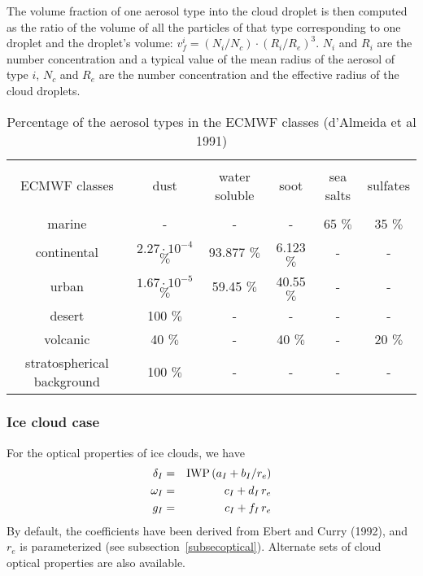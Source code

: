 The volume fraction of one aerosol type into the cloud droplet is then computed as the ratio of the volume of all the particles of that type corresponding to one droplet and the droplet's volume: $v_f^i=(N_i/N_c)\cdot (R_i/R_e)^3$. $N_i$ and $R_i$ are the number concentration and a typical value of the mean radius of the aerosol of type $i$, $N_c$ and $R_e$ are the number concentration and the effective radius of the cloud droplets. 

\bigskip

\begin{table}[!ht]
\caption{Percentage of the aerosol types in the ECMWF classes (d'Almeida et al 1991)}
\begin{center}
\begin{tabular}{|c|c|c|c|c|c|}
   \hline
     &   &   &  &  &    \\
      ECMWF classes & dust & water soluble & soot & sea salts & sulfates  \\
     &   &   &  &  &    \\
   \hline
   \hline
marine & -  &  -   &  -   &  65 $\%$   & 35  $\%$        \\
  \hline
continental & $2.27\cdot 10^{-4}$  $\%$  & 93.877 $\%$    &  6.123  $\%$   & -   & -    \\
  \hline
urban & $1.67\cdot 10^{-5}$ $\%$   & 59.45  $\%$   &  40.55  $\%$   & -   & -    \\
  \hline
desert & 100  $\%$  & -   &  -   & -   & -    \\
  \hline
volcanic & 40  $\%$  & -   &  40  $\%$   & -   & 20  $\%$    \\
  \hline
stratospherical background & 100  $\%$  & -   &  -   & -   & -    \\
  \hline
\end{tabular} 
\end{center}
\end{table} 
\bigskip


%
\subsubsection{Ice cloud case}
%
For the optical properties of ice clouds, we have
\begin{eqnarray}
\delta_{I} &=& {\rm IWP}\, (a_{I} + b_{I} / r_{e} )\cr
\omega_{I} &=& c_{I}  + d_{I}\, r_{e} \cr
g_I        &=& c_{I} + f_{I}\,r_{e}
\end{eqnarray}
By default,  the coefficients have been derived from Ebert and Curry (1992),
and $r_{e}$ is parameterized (see subsection~\ref{subsecoptical}).
Alternate sets of cloud optical properties are also available.


